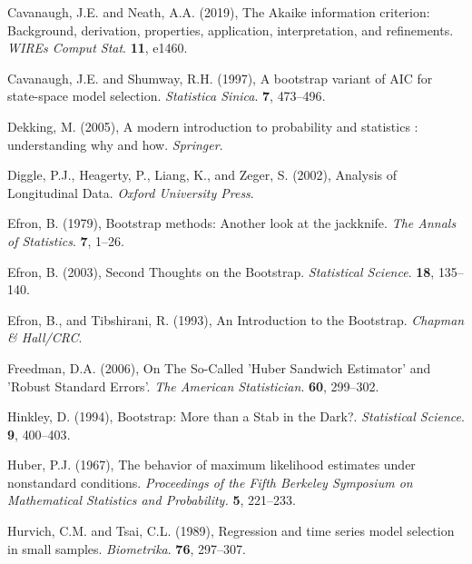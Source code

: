 \phantom{a}

\rff Cavanaugh, J.E. and Neath, A.A. (2019),
      The Akaike information criterion: Background, derivation, properties, application, interpretation, and refinements.
      {\it WIREs Comput Stat}.
      {\bf 11}, {e1460}.

\phantom{a}

\rff Cavanaugh, J.E. and Shumway, R.H. (1997),
      A bootstrap variant of AIC for state-space model selection.
      {\it Statistica Sinica}.
      {\bf 7}, {473--496}.

\phantom{a}

\rff Dekking, M. (2005),
      A modern introduction to probability and statistics : understanding why and how.
      {\it Springer}.

\phantom{a}

\rff Diggle, P.J., Heagerty, P., Liang, K., and Zeger, S.  (2002),
      Analysis of Longitudinal Data.
      {\it Oxford University Press}.

\phantom{a}

\rff Efron, B. (1979),
      Bootstrap methods: Another look at the jackknife.
      {\it The Annals of Statistics}.
      {\bf 7}, {1--26}.

\phantom{a}

\rff Efron, B. (2003),
      Second Thoughts on the Bootstrap.
      {\it Statistical Science}.
      {\bf 18}, {135--140}.

\phantom{a}

\rff Efron, B., and Tibshirani, R. (1993),
      An Introduction to the Bootstrap.
      {\it Chapman \& Hall/CRC}.

\phantom{a}

\rff Freedman, D.A. (2006),
      On The So-Called 'Huber Sandwich Estimator' and 'Robust Standard Errors'.
      {\it The American Statistician}.
      {\bf 60}, {299--302}.

\phantom{a}

\rff Hinkley, D. (1994),
      Bootstrap: More than a Stab in the Dark?.
      {\it Statistical Science}.
      {\bf 9}, {400--403}.

\phantom{a}

\rff Huber, P.J. (1967),
    The behavior of maximum likelihood estimates under nonstandard conditions.
    {\it Proceedings of the Fifth Berkeley Symposium on Mathematical Statistics and Probability.}
    {\bf 5}, {221--233}.

\phantom{a}

\rff Hurvich, C.M. and Tsai, C.L. (1989),
      Regression and time series model selection in small samples.
      {\it Biometrika}.
      {\bf 76}, {297--307}.

